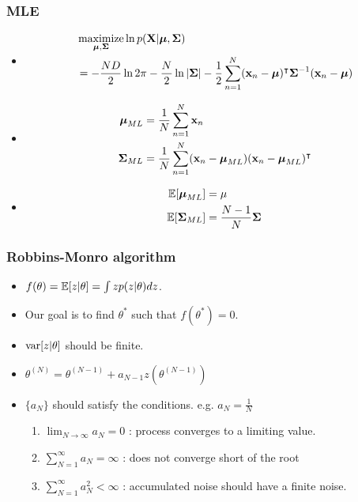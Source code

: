 \documentclass[10pt,mathserif]{beamer}
\begin{document}
\begin{frame}
\frametitle{MLE}
\begin{itemize}
    \item 
        \begin{align}
            &\operatorname*{maximize}_{\boldsymbol{\mu}, \boldsymbol{\Sigma}} \ln p(\mathbf{X}|\boldsymbol{\mu}, \boldsymbol{\Sigma})\nonumber\\
            &=-\frac{ND}{2} \ln 2\pi - \frac{N}{2} \ln |\boldsymbol{\Sigma}| - \frac{1}{2} \sum_{n=1}^N (\mathbf{x}_n-\boldsymbol{\mu})^\intercal \boldsymbol{\Sigma}^{-1} (\mathbf{x}_n-\boldsymbol{\mu}) \nonumber
        \end{align}
    \item 
        \begin{align}
            \boldsymbol{\mu}_{ML} &= \frac{1}{N} \sum_{n=1}^N \mathbf{x}_n\nonumber\\
            \boldsymbol{\Sigma}_{ML} &= \frac{1}{N} \sum_{n=1}^N (\mathbf{x}_n - \boldsymbol{\mu}_{ML})(\mathbf{x}_n - \boldsymbol{\mu}_{ML})^\intercal\nonumber
        \end{align}
    \item 
        \begin{align}
            \mathbb{E}[\boldsymbol{\mu}_{ML}] &= \mu \nonumber\\
            \mathbb{E}[\boldsymbol{\Sigma}_{ML}] &= \frac{N-1}{N}\boldsymbol{\Sigma} \nonumber
        \end{align}
\end{itemize}
\end{frame}
\begin{frame}
\frametitle{Robbins-Monro algorithm}
\begin{itemize}
    \item $f(\theta) = \mathbb{E} [z|\theta] = \int z p(z|\theta) dz$.
    \item Our goal is to find $\theta^{*}$ such that $f(\theta^{*}) = 0$.
    \item $\mathrm{var}[z|\theta]$ should be finite.
    \item $\theta^{(N)} = \theta^{(N-1)}+a_{N-1}z(\theta^{(N-1)})$
    \item $\{a_N\}$ should satisfy the conditions. e.g. $a_N=\frac{1}{N}$
    \begin{enumerate}
        \item $\lim_{N\rightarrow \infty} a_N = 0$ :  process converges to a limiting value.
        \item $\sum_{N=1}^{\infty} a_N = \infty$ : does not converge short of the root
        \item $\sum_{N=1}^{\infty} a_N^2 < \infty$ : accumulated noise should have a finite noise.
    \end{enumerate}
\end{itemize}
\end{frame}
\end{document}
